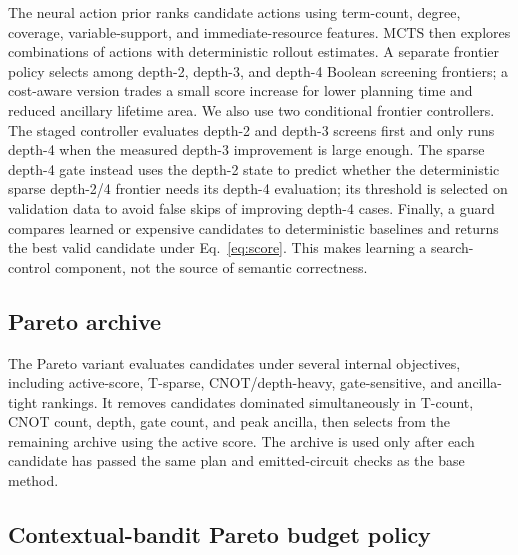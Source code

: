 \documentclass[11pt]{article}
\newcommand{\mcts}{\ensuremath{\mathrm{MCTS}}}
\begin{document}
The neural action prior ranks candidate actions using term-count, degree,
coverage, variable-support, and immediate-resource features.  \mcts{} then
explores combinations of actions with deterministic rollout estimates.  A
separate frontier policy selects among depth-2, depth-3, and depth-4 Boolean
screening frontiers; a cost-aware version trades a small score increase for
lower planning time and reduced ancillary lifetime area.  We also use two
conditional frontier controllers.  The staged controller evaluates depth-2 and
depth-3 screens first and only runs depth-4 when the measured depth-3
improvement is large enough.  The sparse depth-4 gate instead uses the
depth-2 state to predict whether the deterministic sparse depth-2/4 frontier
needs its depth-4 evaluation; its threshold is selected on validation data to
avoid false skips of improving depth-4 cases.  Finally, a guard compares
learned or expensive candidates to deterministic baselines and returns the best
valid candidate under Eq.~\eqref{eq:score}.  This makes learning a
search-control component, not the source of semantic correctness.

\subsection{Pareto archive}

The Pareto variant evaluates candidates under several internal objectives,
including active-score, T-sparse, CNOT/depth-heavy, gate-sensitive, and
ancilla-tight rankings.  It removes candidates dominated simultaneously in
T-count, CNOT count, depth, gate count, and peak ancilla, then selects from the
remaining archive using the active score.  The archive is used only after each
candidate has passed the same plan and emitted-circuit checks as the base
method.

\subsection{Contextual-bandit Pareto budget policy}
\end{document}
